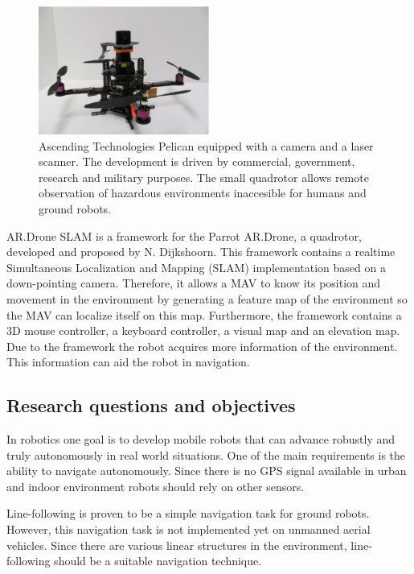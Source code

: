 \documentclass[a4paper]{article}
\begin{document}
\begin{figure}[!h]
	\centering
	\includegraphics[width=0.5\textwidth]{images/pelican.eps}
	\caption{Ascending Technologies Pelican equipped with a camera and a laser scanner. The development is driven by commercial, government, research and military purposes. The small quadrotor allows remote observation of hazardous environments inaccesible for humans and ground robots.}
	\label{pelican}
\end{figure}

AR.Drone SLAM is a framework for the Parrot AR.Drone, a quadrotor, developed and proposed by N. Dijkshoorn. This framework contains a realtime Simultaneous Localization and Mapping (SLAM) implementation based on a down-pointing camera. Therefore, it allows a MAV to know its position and movement in the environment by generating a feature map of the environment so the MAV can localize itself on this map. Furthermore, the framework contains a 3D mouse controller, a keyboard controller, a visual map and an elevation map. Due to the framework the robot acquires more information of the environment. This information can aid the robot in navigation.

\subsection{Research questions and objectives}
In robotics one goal is to develop mobile robots that can advance robustly and truly autonomously in real world situations. One of the main requirements is the ability to navigate autonomously. Since there is no GPS signal available in urban and indoor environment robots should rely on other sensors.

Line-following is proven to be a simple navigation task for ground robots. However, this navigation task is not implemented yet on unmanned aerial vehicles. Since there are various linear structures in the environment, line-following should be a suitable navigation technique.
\end{document}
